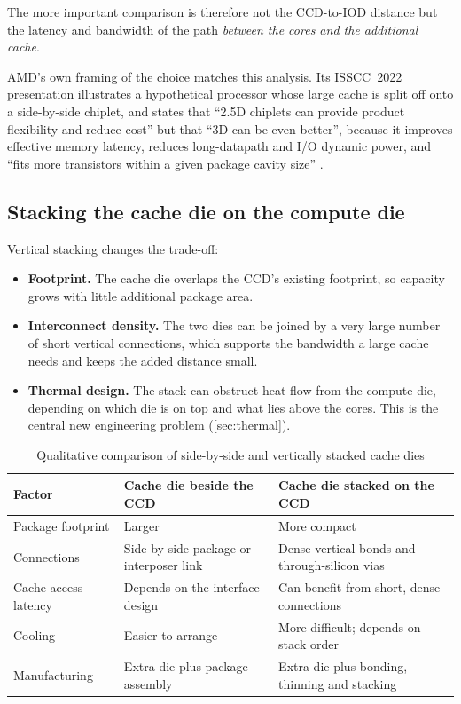 The more important comparison is therefore not the CCD-to-IOD distance but the latency and bandwidth of the path \emph{between the cores and the additional cache}.

AMD's own framing of the choice matches this analysis. Its ISSCC~2022 presentation illustrates a hypothetical processor whose large cache is split off onto a side-by-side chiplet, and states that ``2.5D chiplets can provide product flexibility and reduce cost'' but that ``3D can be even better'', because it improves effective memory latency, reduces long-datapath and I/O dynamic power, and ``fits more transistors within a given package cavity size'' \cite[slide~7]{wuu2022vcache}.

\subsection{Stacking the cache die on the compute die}
Vertical stacking changes the trade-off:
\begin{itemize}
  \item \textbf{Footprint.} The cache die overlaps the CCD's existing footprint, so capacity grows with little additional package area.
  \item \textbf{Interconnect density.} The two dies can be joined by a very large number of short vertical connections, which supports the bandwidth a large cache needs and keeps the added distance small.
  \item \textbf{Thermal design.} The stack can obstruct heat flow from the compute die, depending on which die is on top and what lies above the cores. This is the central new engineering problem (\cref{sec:thermal}).
\end{itemize}

\begin{table}[htbp]
  \centering
  \caption{Qualitative comparison of side-by-side and vertically stacked cache dies}
  \label{tab:horizontal-vs-vertical}
  \small
  \begin{tabularx}{\textwidth}{@{}>{\raggedright\arraybackslash}p{3.1cm}>{\raggedright\arraybackslash}X>{\raggedright\arraybackslash}X@{}}
    \toprule
    \textbf{Factor} & \textbf{Cache die beside the CCD} & \textbf{Cache die stacked on the CCD} \\
    \midrule
    Package footprint & Larger & More compact \\
    Connections & Side-by-side package or interposer link & Dense vertical bonds and through-silicon vias \\
    Cache access latency & Depends on the interface design & Can benefit from short, dense connections \\
    Cooling & Easier to arrange & More difficult; depends on stack order \\
    Manufacturing & Extra die plus package assembly & Extra die plus bonding, thinning and stacking \\
    \bottomrule
  \end{tabularx}
\end{table}

